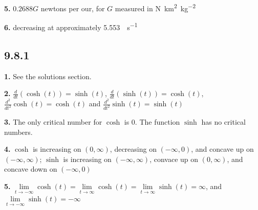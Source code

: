 \documentclass[12pt,]{book}
\theoremstyle{plain}
\theoremstyle{definition}
\numberwithin{equation}{section}
\newcommand{\fe}[2]{#1\mathopen{}\left(#2\right)\mathclose{}}
\newcommand{\ointerval}[2]{\left(#1,#2\right)}
\newcommand{\lzoo}[2]{{\frac{d}{d#1}}{\left(#2\right)}}
\newcommand{\lzon}[2]{\frac{d^{#1}}{d#2^{#1}}}
\begin{document}
            \par\smallskip
\noindent\textbf{5.}\quad{}
                \(0.2688G\) newtons per our, for \(G\) measured in \si{\newton\kilo\meter\tothe{2}\per\kilo\gram\tothe{2}}%

            \par\smallskip
\noindent\textbf{6.}\quad{}
                decreasing at approximately \SI{5.553}{\inch\per\second}%

            \par\smallskip
\subsection*{9.8.1 }
\noindent\textbf{1.}\quad{}
                    See the solutions section.%

                \par\smallskip
\noindent\textbf{2.}\quad{}
                    \(\lzoo{t}{\fe{\cosh}{t}}=\fe{\sinh}{t}\), \(\lzoo{t}{\fe{\sinh}{t}}=\fe{\cosh}{t}\), \(\lzon{2}{t}{\fe{\cosh}{t}}=\fe{\cosh}{t}\) and \(\lzon{2}{t}{\fe{\sinh}{t}}=\fe{\sinh}{t}\)%

                \par\smallskip
\noindent\textbf{3.}\quad{}
                    The only critical number for \(\cosh\) is \(0\). The function \(\sinh\) has no critical numbers.%

                \par\smallskip
\noindent\textbf{4.}\quad{}
                    \(\cosh\) is increasing on \(\ointerval{0}{\infty}\), decreasing on \(\ointerval{-\infty}{0}\), and concave up on \(\ointerval{-\infty}{\infty}\); \(\sinh\) is increasing on \(\ointerval{-\infty}{\infty}\), convace up on \(\ointerval{0}{\infty}\), and concave down on \(\ointerval{-\infty}{0}\)%

                \par\smallskip
\noindent\textbf{5.}\quad{}
                    \(\lim\limits_{t\to-\infty}\fe{\cosh}{t}=\lim\limits_{t\to\infty}\fe{\cosh}{t}=\lim\limits_{t\to\infty}\fe{\sinh}{t}=\infty\), and \(\lim\limits_{t\to-\infty}\fe{\sinh}{t}=-\infty\)%
\end{document}
